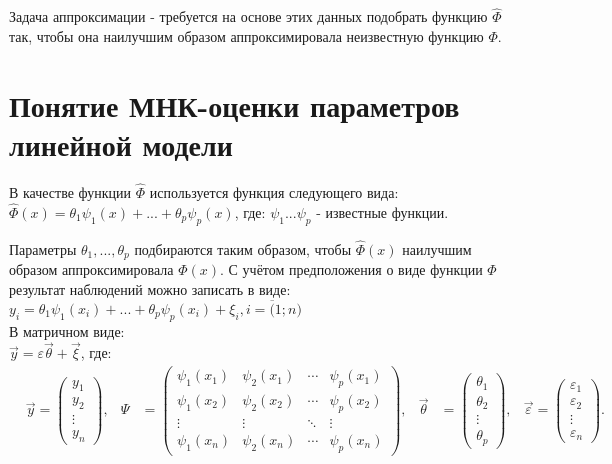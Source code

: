Задача аппроксимации - требуется на основе этих данных подобрать функцию $\hat\Phi$ так, чтобы она наилучшим образом аппроксимировала неизвестную функцию $\Phi$.

\section{Понятие МНК-оценки параметров линейной модели}
В качестве функции $\hat\Phi$ используется функция следующего вида:\\
$\hat\Phi(x) = \theta_1 \psi_1(x) + ... + \theta_p \psi_p (x)$, где: $\psi_1 ... \psi_p$ - известные функции.

Параметры $\theta_1, ..., \theta_p$ подбираются таким образом, чтобы $\hat\Phi(x)$ наилучшим образом аппроксимировала $\Phi(x)$. С учётом предположения о виде функции $\hat\Phi$ результат наблюдений можно записать в виде:\\
$y_i = \theta_1 \psi_1(x_i) + ... + \theta_p \psi_p (x_i) + \xi_i, i = \overline(1; n)$\\
В матричном виде:\\
$\overrightarrow{y} = \varepsilon \overrightarrow{\theta} + \overrightarrow{\xi}$, где:\\

\begin{align*}
    & \overrightarrow{y} = \begin{pmatrix} 
        y_1    \\ 
        y_2    \\ 
        \vdots \\ 
        y_n 
    \end{pmatrix},
    & \Psi &= \begin{pmatrix}
        \psi_1(x_1) & \psi_2(x_1) & \cdots & \psi_p(x_1) \\
        \psi_1(x_2) & \psi_2(x_2) & \cdots & \psi_p(x_2) \\
        \vdots      & \vdots      & \ddots & \vdots      \\
        \psi_1(x_n) & \psi_2(x_n) & \cdots & \psi_p(x_n)
    \end{pmatrix},
    & \vec{\theta} &= \begin{pmatrix}
        \theta_1 \\
        \theta_2 \\ 
        \vdots   \\ 
        \theta_p
    \end{pmatrix},
    & \overrightarrow{\varepsilon} = \begin{pmatrix} 
        \varepsilon_1 \\
        \varepsilon_2 \\ 
        \vdots        \\ 
        \varepsilon_n
    \end{pmatrix}.
\end{align*} 

